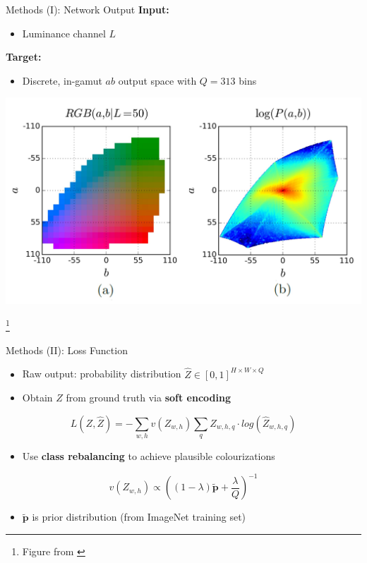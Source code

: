 \documentclass{beamer}
\newcommand\blfootnote[1]{%
  \begingroup
  \renewcommand\thefootnote{}\footnote{#1}%
  \addtocounter{footnote}{-1}%
  \endgroup
}
\begin{document}

\begin{frame}{Methods (I): Network Output}
  \textbf{Input:}
    \begin{itemize}
       \item Luminance channel $L$
    \end{itemize}

  \medskip

  \textbf{Target:}
    \begin{itemize}
      \item Discrete, in-gamut $ab$ output space with $Q = 313$ bins
    \end{itemize}

  \medskip

  \begin{center}
    \includegraphics[width=.8\linewidth]{resources/gamut.jpg}
  \end{center}

  \blfootnote{Figure from \cite{Zhang2016}}
\end{frame}

\begin{frame}{Methods (II): Loss Function}
  \begin{itemize}
    \item Raw output: probability distribution $\hat{Z} \in [0, 1]^{H \times W \times Q}$
    \item Obtain $Z$ from ground truth via \textbf{soft encoding}
  \end{itemize}

  \begin{equation}
    L(Z, \hat{Z}) = -\sum_{w,h} v(Z_{w,h}) \sum_q Z_{w,h,q} \cdot log(\hat{Z}_{w,h,q})
  \end{equation}

  \begin{itemize}
    \item Use \textbf{class rebalancing} to achieve plausible colourizations
  \end{itemize}

  \begin{equation}
    v(Z_{w,h}) \propto \left((1 - \lambda) \tilde{\bm{p}} + \frac{\lambda}{Q} \right)^{-1}
  \end{equation}

  \begin{itemize}
    \item $\tilde{\bm{p}}$ is prior distribution (from ImageNet training set)
  \end{itemize}
\end{frame}
\end{document}
